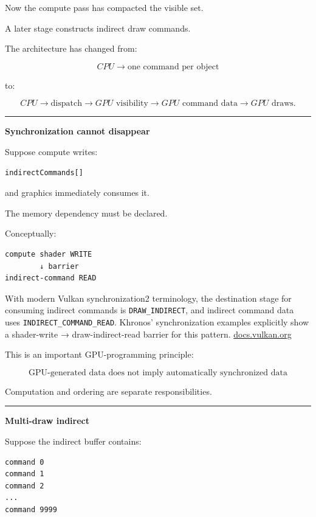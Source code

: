 Now the compute pass has compacted the visible set.

A later stage constructs indirect draw commands.

The architecture has changed from:

\[
CPU\rightarrow\text{one command per object}
\]

to:

\[
CPU\rightarrow\text{dispatch}
\rightarrow
GPU\text{ visibility}
\rightarrow
GPU\text{ command data}
\rightarrow
GPU\text{ draws}.
\]

\begin{center}\rule{0.5\linewidth}{0.5pt}\end{center}

\textbf{Synchronization cannot disappear}

Suppose compute writes:

\begin{verbatim}
indirectCommands[]
\end{verbatim}

and graphics immediately consumes it.

The memory dependency must be declared.

Conceptually:

\begin{verbatim}
compute shader WRITE
        ↓ barrier
indirect-command READ
\end{verbatim}

With modern Vulkan synchronization2 terminology, the destination stage for consuming indirect commands is \texttt{DRAW\_INDIRECT}, and indirect command data uses \texttt{INDIRECT\_COMMAND\_READ}. Khronos' synchronization examples explicitly show a shader-write → draw-indirect-read barrier for this pattern. \href{https://docs.vulkan.org/spec/latest/chapters/synchronization.html?utm_source=chatgpt.com}{docs.vulkan.org}

This is an important GPU-programming principle:

\[
\boxed{
\text{GPU-generated data does not imply automatically synchronized data}
}
\]

Computation and ordering are separate responsibilities.

\begin{center}\rule{0.5\linewidth}{0.5pt}\end{center}

\textbf{Multi-draw indirect}

Suppose the indirect buffer contains:

\begin{verbatim}
command 0
command 1
command 2
...
command 9999
\end{verbatim}

